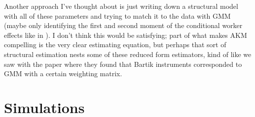 \documentclass{article}
\begin{document}
Another approach I've thought about is just writing down a structural model with all of these parameters and trying to match it to the data with GMM (maybe only identifying the first and second moment of the conditional worker effects like in \citet{bonhomme2019distributional}). I don't think this would be satisfying; part of what makes AKM compelling is the very clear estimating equation, but perhaps that sort of structural estimation nests some of these reduced form estimators, kind of like we saw with the \citet{goldsmith2020bartik} paper where they found that Bartik instruments corresponded to GMM with a certain weighting matrix.









\section{Simulations}
\end{document}

